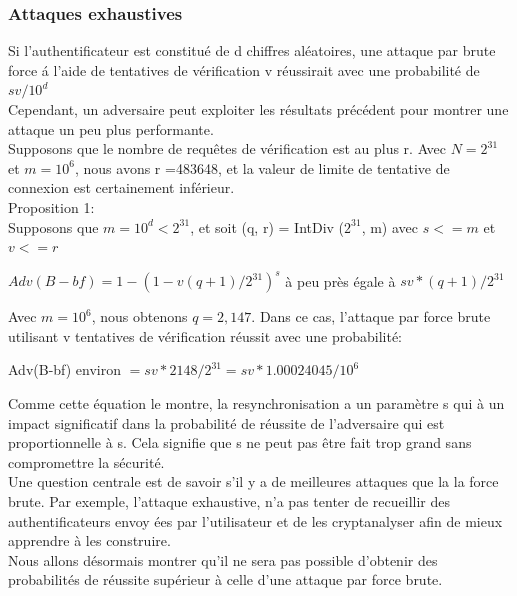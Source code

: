 \documentclass{../res/univ-projet}
\begin{document}
    \subsubsection{Attaques exhaustives}
    Si l'authentificateur est constitu\'{e} de d chiffres al\'{e}atoires, une attaque par brute force \'{a} 		l'aide de tentatives de v\'{e}rification v r\'{e}ussirait avec une probabilit\'{e} de $sv/10^d$\\
    Cependant, un adversaire peut exploiter les r\'{e}sultats pr\'{e}c\'{e}dent pour montrer une attaque un peu 		plus performante.\\
    Supposons que le nombre de requ\^{e}tes de v\'{e}rification est au plus r. Avec $N = 2^{31}$ et $m = 10^6$, 	nous avons r =483648, et la valeur de limite de tentative de connexion est certainement inférieur.\\
	Proposition 1:\\
	Supposons que $m = 10^d < 2^{31}$, et soit (q, r) = IntDiv ($2^{31}$, m) avec $s <= m$ et $v <= r$\\
	\begin{center}
		$Adv(B-bf) = 1 - (1 - v(q+1)/2^31)^s$ \`{a} peu pr\`{e}s \'{e}gale \`{a}  $sv * (q+1)/2^{31}$\\
	\end{center}
	Avec $m = 10^6$, nous obtenons $q = 2,147$. Dans ce cas, l'attaque par force brute
    utilisant v tentatives de vérification réussit avec une probabilité:\\
	\begin{center}    
    	Adv(B-bf) environ $= sv * 2148/2^{31} = sv * 1.00024045/10^6$\\
    \end{center}
    Comme cette équation le montre, la resynchronisation a un paramètre s qui \`{a}
   	un impact significatif dans  la probabilit\'{e} de r\'{e}ussite de l'adversaire qui est
  	proportionnelle \`{a} s. Cela signifie que s ne peut pas \^{e}tre fait trop grand
   	sans compromettre la s\'{e}curit\'{e}.\\
   	Une question centrale est de savoir s'il y a de meilleures attaques que la
   	la force brute. Par exemple, l'attaque exhaustive, n'a pas tenter de recueillir des authentificateurs envoy		\'{e}es par l'utilisateur et de les cryptanalyser afin de mieux apprendre \`{a} les construire.\\
   	Nous allons d\'{e}sormais montrer qu'il ne sera pas possible d'obtenir des probabilit\'{e}s de r\'{e}ussite 	sup\'{e}rieur \`{a} celle d'une attaque par force brute.\\
\end{document}
